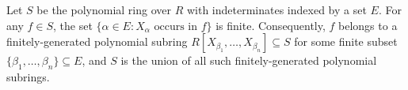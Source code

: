 Let $S$ be the polynomial ring over $R$ with indeterminates indexed by a set $E$. For any $f \in S$, the set $\{\alpha \in E : X_\alpha \text{ occurs in } f\}$ is finite. Consequently, $f$ belongs to a finitely-generated polynomial subring $R[X_{\beta_1}, \dots, X_{\beta_n}] \subseteq S$ for some finite subset $\{\beta_1, \dots, \beta_n\} \subseteq E$, and $S$ is the union of all such finitely-generated polynomial subrings.

